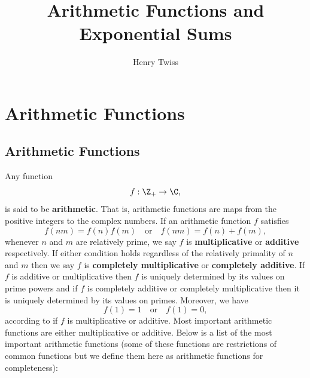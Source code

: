 \documentclass[12pt]{article}
\title{Arithmetic Functions and Exponential Sums}
\author{Henry Twiss}
\begin{document}
  \date{}
  \maketitle
  \tableofcontents
  \section{Arithmetic Functions}
    \subsection{Arithmetic Functions}
      Any function
      \[
        f:\Z_{+} \to \C,
      \]
      is said to be \textbf{arithmetic}. That is, arithmetic functions are maps from the positive integers to the complex numbers. If an arithmetic function \(f\) satisfies
      \[
        f(nm) = f(n)f(m) \quad \text{or} \quad f(nm) = f(n)+f(m),
      \]
      whenever \(n\) and \(m\) are relatively prime, we say \(f\) is \textbf{multiplicative} or \textbf{additive} respectively. If either condition holds regardless of the relatively primality of \(n\) and \(m\) then we say \(f\) is \textbf{completely multiplicative} or \textbf{completely additive}. If \(f\) is additive or multiplicative then \(f\) is uniquely determined by its values on prime powers and if \(f\) is completely additive or completely multiplicative then it is uniquely determined by its values on primes. Moreover, we have
      \[
        f(1) = 1 \quad \text{or} \quad f(1) = 0,
      \]
      according to if \(f\) is multiplicative or additive. Most important arithmetic functions are either multiplicative or additive. Below is a list of the most important arithmetic functions (some of these functions are restrictions of common functions but we define them here as arithmetic functions for completeness):
\end{document}
